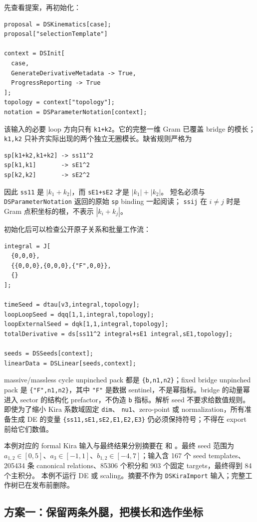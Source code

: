 ﻿\documentclass[a4paper,11pt]{article}
\begin{document}
先查看提案，再初始化：
\begin{verbatim}
proposal = DSKinematics[case];
proposal["selectionTemplate"]

context = DSInit[
  case,
  GenerateDerivativeMetadata -> True,
  ProgressReporting -> True
];
topology = context["topology"];
notation = DSParameterNotation[context];
\end{verbatim}
该输入的必要 loop 方向只有 \texttt{k1+k2}。它的完整一维 Gram 已覆盖 bridge 的模长；
\texttt{k1,k2} 只补齐实际出现的两个独立无圈模长。缺省规则严格为
\begin{verbatim}
sp[k1+k2,k1+k2] -> ss11^2
sp[k1,k1]       -> sE1^2
sp[k2,k2]       -> sE2^2
\end{verbatim}
因此 \texttt{ss11} 是 $|k_1+k_2|$，而 \texttt{sE1+sE2} 才是 $|k_1|+|k_2|$。
短名必须与 \texttt{DSParameterNotation} 返回的原始 \texttt{sp} binding 一起阅读；
\texttt{ssij} 在 $i\ne j$ 时是 Gram 点积坐标的根，不表示 $|k_i+k_j|$。

初始化后可以检查公开原子关系和批量工作流：
\begin{verbatim}
integral = J[
  {0,0,0},
  {{0,0,0},{0,0,0},{"F",0,0}},
  {}
];

timeSeed = dtau[v3,integral,topology];
loopLoopSeed = dqq[1,1,integral,topology];
loopExternalSeed = dqk[1,1,integral,topology];
totalDerivative = ds[ss11^2 integral+sE1 integral,sE1,topology];

seeds = DSSeeds[context];
linearData = DSLinear[seeds,context];
\end{verbatim}
massive/massless cycle unpinched pack 都是 \texttt{\{b,n1,n2\}}；fixed bridge unpinched pack 是
\texttt{\{"F",n1,n2\}}，其中 \texttt{"F"} 是数据 sentinel，不是幂指标。bridge 的动量幂进入
sector 的结构化 prefactor，不伪造 \texttt{b} 指标。解析 seed 不要求给数值规则。即使为了缩小 Kira 系数域固定 \texttt{dim}、
\texttt{nu1}、zero-point 或 normalization，所有准备生成 DE 的变量
\texttt{\{ss11,sE1,sE2,E1,E2,E3\}} 仍必须保持符号；不得在 export 前给它们数值。

本例对应的 formal Kira 输入与最终结果分别摘要在
 和
。最终 seed 范围为
$a_{1,2}\in[0,5]$、$a_3\in[-1,1]$、$b_{1,2}\in[-4,7]$；输入含 167 个 seed templates、
205434 条 canonical relations、85306 个积分和 903 个固定 targets，最终得到 84 个主积分。
本例不运行 DE 或 scaling。摘要不作为 \texttt{DSKiraImport} 输入；完整工作树已在发布前删除。

\subsection{方案一：保留两条外腿，把模长和选作坐标}
\end{document}
